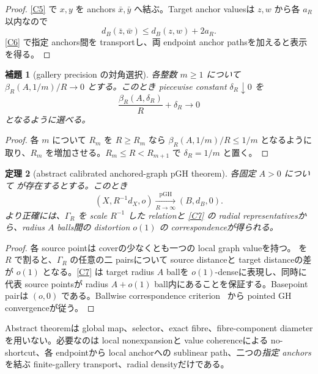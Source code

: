 \documentclass[11pt,a4paper]{ltjsarticle}
\theoremstyle{plain}
\newtheorem{theorem}{定理}[section]\newtheorem{proposition}[theorem]{命題}
\newtheorem{lemma}[theorem]{補題}\newtheorem{corollary}[theorem]{系}
\theoremstyle{definition}
\theoremstyle{remark}
\begin{document}
\begin{proof}
\ref{C5} で $x,y$ を anchors $\bar x,\bar y$ へ結ぶ。Target anchor valuesは $z,w$ から各 $a_R$ 以内なので
\[
 d_B(\bar z,\bar w)\le d_B(z,w)+2a_R.
\]
\ref{C6} で指定 anchors間を transportし、両 endpoint anchor pathsを加えると表示を得る。
\end{proof}

\begin{lemma}[gallery precision の対角選択]\label{lem:gallery-diagonal}
各整数 $m\ge1$ について $\beta_R(A,1/m)/R\to0$ とする。このとき piecewise constant $\delta_R\downarrow0$ を
\[
 \frac{\beta_R(A,\delta_R)}R+\delta_R\longrightarrow0
\]
となるように選べる。
\end{lemma}

\begin{proof}
各 $m$ について $R_m$ を $R\ge R_m$ なら $\beta_R(A,1/m)/R\le1/m$ となるように取り、$R_m$ を増加させる。$R_m\le R<R_{m+1}$ で $\delta_R=1/m$ と置く。
\end{proof}

\begin{theorem}[abstract calibrated anchored-graph pGH theorem]\label{thm:abstract-pgh}
各固定 $A>0$ について  が存在するとする。このとき
\[
 (X,R^{-1}d_X,o)\xrightarrow[R\to\infty]{\mathrm{pGH}}(B,d_B,0).
\]
より正確には、$\Gamma_R$ を scale $R^{-1}$ した relationと \ref{C7} の radial representativesから、radius $A$ balls間の distortion $o(1)$ の correspondenceが得られる。
\end{theorem}

\begin{proof}
各 source pointは coverの少なくとも一つの local graph valueを持つ。 を $R$ で割ると、$\Gamma_R$ の任意の二 pairsについて source distanceと target distanceの差が $o(1)$ となる。\ref{C7} は target radius $A$ ballを $o(1)$-denseに表現し、同時に代表 source pointsが radius $A+o(1)$ ball内にあることを保証する。Basepoint pairは $(o,0)$ である。Ballwise correspondence criterion~\cite{BBI} から pointed GH convergenceが従う。
\end{proof}

\begin{auditbox}
Abstract theoremは global map、selector、exact fibre、fibre-component diameterを用いない。必要なのは local nonexpansionと value coherenceによる no-shortcut、各 endpointから local anchorへの sublinear path、二つの\emph{指定 anchors}を結ぶ finite-gallery transport、radial densityだけである。
\end{auditbox}
\end{document}
